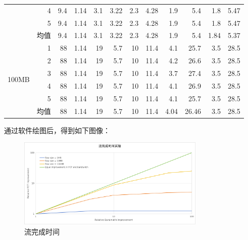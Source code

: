 \documentclass[11pt]{article}
\begin{document}
\begin{table}[htbp]
\begin{tabular}{|c|l|r|r|r|r|r|r|r|r|r|r|}
\cline{2-12}          & \multicolumn{1}{r|}{4} & 9.4   & 1.14  & 3.1   & 3.22  & 2.3   & 4.28  & 1.9   & 5.4   & 1.8   & 5.47 \bigstrut\\
\cline{2-12}          & \multicolumn{1}{r|}{5} & 9.4   & 1.14  & 3.1   & 3.22  & 2.3   & 4.28  & 1.9   & 5.4   & 1.8   & 5.47 \bigstrut\\
\cline{2-12}          & 均值    & 9.4   & 1.14  & 3.1   & 3.22  & 2.3   & 4.28  & 1.9   & 5.4   & 1.84  & 5.37 \bigstrut\\
    \hline
    \multirow{6}[12]{*}{100MB} & \multicolumn{1}{r|}{1} & 88    & 1.14  & 19    & 5.7   & 10    & 11.4  & 4.1   & 25.7  & 3.5   & 28.5 \bigstrut\\
\cline{2-12}          & \multicolumn{1}{r|}{2} & 88    & 1.14  & 19    & 5.7   & 10    & 11.4  & 4.2   & 26.6  & 3.5   & 28.5 \bigstrut\\
\cline{2-12}          & \multicolumn{1}{r|}{3} & 88    & 1.14  & 19    & 5.7   & 10    & 11.4  & 3.7   & 27.4  & 3.5   & 28.5 \bigstrut\\
\cline{2-12}          & \multicolumn{1}{r|}{4} & 88    & 1.14  & 19    & 5.7   & 10    & 11.4  & 4.1   & 26.9  & 3.5   & 28.5 \bigstrut\\
\cline{2-12}          & \multicolumn{1}{r|}{5} & 88    & 1.14  & 19    & 5.7   & 10    & 11.4  & 4.1   & 25.7  & 3.5   & 28.5 \bigstrut\\
\cline{2-12}          & 均值    & 88    & 1.14  & 19    & 5.7   & 10    & 11.4  & 4.04  & 26.46 & 3.5   & 28.5 \bigstrut\\
    \hline
    \end{tabular}%
\end{table}%

\newpage


通过软件绘图后，得到如下图像：

\begin{figure}[!htbp]
  \centering
  \includegraphics[width=0.8\textwidth]{fig/output.png}
  \caption{流完成时间}
\end{figure}
\end{document}
